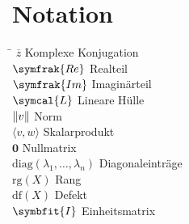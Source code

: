 \chapter*{Notation}
\begin{tabbing}
    \hspace{4cm} \= \kill
    \(\overline{z}\) \>  Komplexe Konjugation \\
    \(\symfrak{Re}\) \>  Realteil \\
    \(\symfrak{Im}\) \>  Imaginärteil \\
    \(\symcal{L}\)   \>  Lineare Hülle \\ 
    \(\lVert v\rVert\)     \>  Norm \\ 
    \(\langle v,w \rangle\) \> Skalarprodukt \\
    \(\symbf{0}\) \> Nullmatrix \\
    \(\text{diag}(\lambda_1,\ldots,\lambda_n)\) \> Diagonaleinträge \\
    \(\text{rg}(X)\) \> Rang \\
    \(\text{df}(X)\) \> Defekt \\
    \(\symbfit{I}\) \> Einheitsmatrix \\
\end{tabbing}